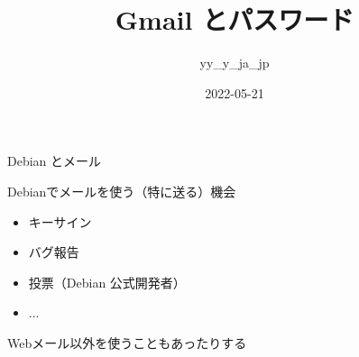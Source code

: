 \title{Gmail とパスワード}
\author{yy\_y\_ja\_jp}
\date{2022-05-21}



\begin{frame}
\titlepage{}
\end{frame}


\begin{frame}{Debian とメール}

Debianでメールを使う（特に送る）機会
\begin{itemize}
 \item キーサイン
 \item バグ報告
 \item 投票（Debian 公式開発者）
 \item ...
\end{itemize}

Webメール以外を使うこともあったりする

\end{frame}

